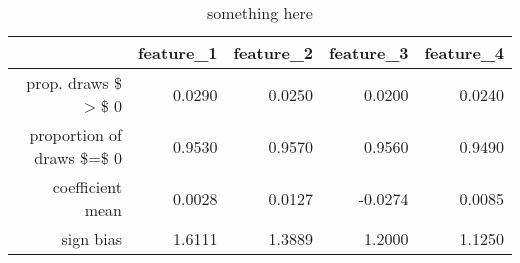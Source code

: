 \begin{table}[ht]
\centering
\begin{tabular}{rrrrr}
  \hline
 & feature\_1 & feature\_2 & feature\_3 & feature\_4 \\ 
  \hline
prop. draws \$$>$\$ 0 & 0.0290 & 0.0250 & 0.0200 & 0.0240 \\ 
  proportion of draws \$=\$ 0 & 0.9530 & 0.9570 & 0.9560 & 0.9490 \\ 
  coefficient mean & 0.0028 & 0.0127 & -0.0274 & 0.0085 \\ 
  sign bias & 1.6111 & 1.3889 & 1.2000 & 1.1250 \\ 
   \hline
\end{tabular}
\caption{something here} 
\end{table}
